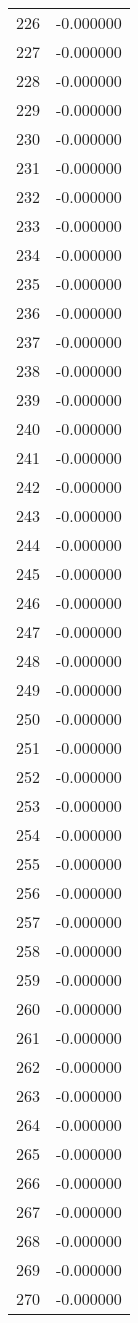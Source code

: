 \documentclass[12pt]{article}
\begin{document}
\begin{longtable}{@{}cc@{}}
226 & -0.000000 \\
227 & -0.000000 \\
228 & -0.000000 \\
229 & -0.000000 \\
230 & -0.000000 \\
231 & -0.000000 \\
232 & -0.000000 \\
233 & -0.000000 \\
234 & -0.000000 \\
235 & -0.000000 \\
236 & -0.000000 \\
237 & -0.000000 \\
238 & -0.000000 \\
239 & -0.000000 \\
240 & -0.000000 \\
241 & -0.000000 \\
242 & -0.000000 \\
243 & -0.000000 \\
244 & -0.000000 \\
245 & -0.000000 \\
246 & -0.000000 \\
247 & -0.000000 \\
248 & -0.000000 \\
249 & -0.000000 \\
250 & -0.000000 \\
251 & -0.000000 \\
252 & -0.000000 \\
253 & -0.000000 \\
254 & -0.000000 \\
255 & -0.000000 \\
256 & -0.000000 \\
257 & -0.000000 \\
258 & -0.000000 \\
259 & -0.000000 \\
260 & -0.000000 \\
261 & -0.000000 \\
262 & -0.000000 \\
263 & -0.000000 \\
264 & -0.000000 \\
265 & -0.000000 \\
266 & -0.000000 \\
267 & -0.000000 \\
268 & -0.000000 \\
269 & -0.000000 \\
270 & -0.000000 \\

\end{longtable}
\end{document}
